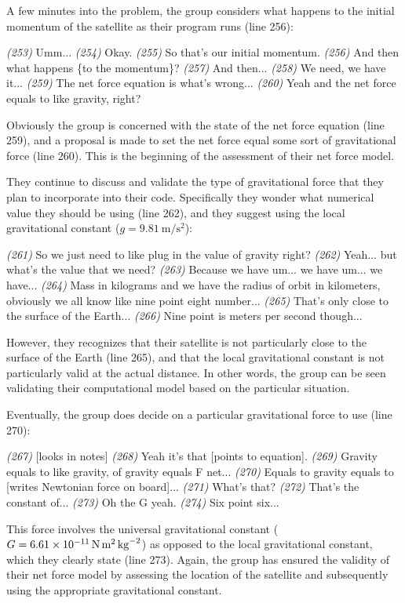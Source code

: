 \documentclass{msuphddissertation}
\begin{document}
\begin{doublespace}
A few minutes into the problem, the group considers what happens to the initial momentum of the satellite as their program runs (line 256):
\begin{description}
\SA \textit{(253)} Umm...
\SB	\textit{(254)} Okay.
\SA \textit{(255)} So that's our initial momentum.			
\SA \textit{(256)} And then what happens \{to the momentum\}?
\SD \textit{(257)} And then...
\SA \textit{(258)} We need, we have it...		
\SA \textit{(259)} The net force equation is what's wrong...
\SD \textit{(260)} Yeah and the net force equals to like gravity, right?\end{description}  Obviously the group is concerned with the state of the net force equation (line 259), and a proposal is made to set the net force equal some sort of gravitational force (line 260).  This is the beginning of the assessment of their net force model.

They continue to discuss and validate the type of gravitational force that they plan to incorporate into their code.  Specifically they wonder what numerical value they should be using (line 262), and they suggest using the local gravitational constant ($g=\SI{9.81}{\meter\per\second\squared}$):
\begin{description}
\SD \textit{(261)} So we just need to like plug in the value of gravity right?
\SA \textit{(262)} Yeah... but what's the value that we need?
\SA \textit{(263)} Because we have um... we have um... we have...
\SA \textit{(264)} Mass in kilograms and we have {the radius of orbit in} kilometers, obviously we all know like nine point eight number...
\SC \textit{(265)} That's {only} close to {the surface of the Earth}...	
\SA \textit{(266)} Nine point is meters per second though...\end{description}  However, they recognizes that their satellite is not particularly close to the surface of the Earth (line 265), and that the local gravitational constant is not particularly valid at the actual distance.  In other words, the group can be seen validating their computational model based on the particular situation.

Eventually, the group does decide on a particular gravitational force to use (line 270):
\begin{description}		
\SC \textit{(267)} [looks in notes]
\SD \textit{(268)} Yeah it's that [points to equation].
\SD \textit{(269)} Gravity equals to like gravity, of gravity equals F net...
\SD \textit{(270)} Equals to gravity equals to [writes Newtonian force on board]...
\SB	\textit{(271)} What's that?		
\SD \textit{(272)} That's the constant of...
\SB	\textit{(273)} Oh the G yeah.		
\SB	\textit{(274)} Six point six...\end{description}  This force involves the universal gravitational constant ($G=\SI{6.61E-11}{\newton\meter\squared\per\kilo\gram\squared}$) as opposed to the local gravitational constant, which they clearly state (line 273).  Again, the group has ensured the validity of their net force model by assessing the location of the satellite and subsequently using the appropriate gravitational constant.


\end{doublespace}
\end{document}
